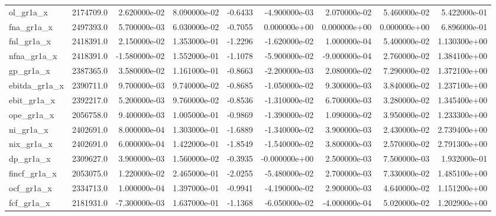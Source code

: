 \documentclass[10pt]{article}
\begin{document}
\begin{landscape}
\begin{longtable}{|l|r|r|r|r|r|r|r|r|}
ol\_gr1a\_x               &  2174709.0 &  2.620000e-02 &  8.090000e-02 &     -0.6433 & -4.900000e-03 &  2.070000e-02 &  5.460000e-02 &  5.422000e-01 \\
fna\_gr1a\_x              &  2497393.0 &  5.700000e-03 &  6.030000e-02 &     -0.7055 &  0.000000e+00 &  0.000000e+00 &  0.000000e+00 &  6.896000e-01 \\
fnl\_gr1a\_x              &  2418391.0 &  2.150000e-02 &  1.353000e-01 &     -1.2296 & -1.620000e-02 &  1.000000e-04 &  5.400000e-02 &  1.130300e+00 \\
nfna\_gr1a\_x             &  2418391.0 & -1.580000e-02 &  1.552000e-01 &     -1.1078 & -5.900000e-02 & -9.000000e-04 &  2.760000e-02 &  1.384100e+00 \\
gp\_gr1a\_x               &  2387365.0 &  3.580000e-02 &  1.161000e-01 &     -0.8663 & -2.200000e-03 &  2.080000e-02 &  7.290000e-02 &  1.372100e+00 \\
ebitda\_gr1a\_x           &  2390711.0 &  9.700000e-03 &  9.740000e-02 &     -0.8685 & -1.050000e-02 &  9.300000e-03 &  3.840000e-02 &  1.237100e+00 \\
ebit\_gr1a\_x             &  2392217.0 &  5.200000e-03 &  9.760000e-02 &     -0.8536 & -1.310000e-02 &  6.700000e-03 &  3.280000e-02 &  1.345400e+00 \\
ope\_gr1a\_x              &  2056758.0 &  9.400000e-03 &  1.005000e-01 &     -0.9869 & -1.390000e-02 &  1.090000e-02 &  3.950000e-02 &  1.233300e+00 \\
ni\_gr1a\_x               &  2402691.0 &  8.000000e-04 &  1.303000e-01 &     -1.6889 & -1.340000e-02 &  3.900000e-03 &  2.430000e-02 &  2.739400e+00 \\
nix\_gr1a\_x              &  2402691.0 &  6.000000e-04 &  1.422000e-01 &     -1.8549 & -1.540000e-02 &  3.800000e-03 &  2.570000e-02 &  2.791300e+00 \\
dp\_gr1a\_x               &  2309627.0 &  3.900000e-03 &  1.560000e-02 &     -0.3935 & -0.000000e+00 &  2.500000e-03 &  7.500000e-03 &  1.932000e-01 \\
fincf\_gr1a\_x            &  2053075.0 &  1.220000e-02 &  2.465000e-01 &     -2.0255 & -5.480000e-02 &  2.700000e-03 &  7.330000e-02 &  1.485100e+00 \\
ocf\_gr1a\_x              &  2334713.0 &  1.000000e-04 &  1.397000e-01 &     -0.9941 & -4.190000e-02 &  2.900000e-03 &  4.640000e-02 &  1.151200e+00 \\
fcf\_gr1a\_x              &  2181931.0 & -7.300000e-03 &  1.637000e-01 &     -1.1368 & -6.050000e-02 & -4.000000e-04 &  5.020000e-02 &  1.202900e+00 \\

\end{longtable}
\end{landscape}
\end{document}
